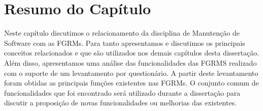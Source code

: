 \section{Resumo do Capítulo}\label{sec:resumo_do_capitulo}

Neste capítulo discutimos o relacionamento da disciplina de Manutenção de
Software com as FGRMs. Para tanto apresentamos e discutimos os principais
conceitos relacionados e que são utilizados nos demais capítulos desta
dissertação. Além disso, apresentamos uma análise das funcionalidades das FGRMS
realizado com o suporte de um levantamento por questionário. A partir deste
levantamento foram obtidas as principais funções existentes nas FGRMs. O
conjunto comum de funcionalidades que foi encontrado será utilizado durante a
dissertação para discutir a proposição de novas funcionalidades ou melhorias das
existentes.
